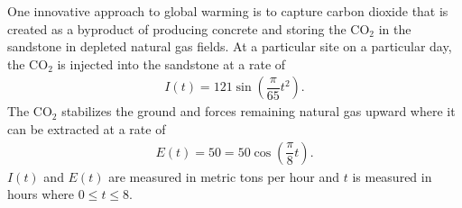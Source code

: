 \begin{questions}
    One innovative approach to global warming is to capture carbon dioxide that is created as a byproduct of producing concrete and storing the $\mathrm{CO_2}$ in the sandstone in depleted natural gas fields. At a particular site on a particular day, the $\mathrm{CO_2}$ is injected into the sandstone at a rate of \begin{align*}
        I(t) = 121\sin \left(\dfrac{\pi}{65}t^2\right).
    \end{align*}
    The $\mathrm{CO_2}$ stabilizes the ground and forces remaining natural gas upward where it can be extracted at a rate of \begin{align*}
        E(t) = 50 = 50\cos \left(\dfrac{\pi}{8}t\right).
    \end{align*}
    $I(t)$ and $E(t)$ are measured in metric tons per hour and $t$ is measured in hours where $0 \leq t \leq 8$. \\

\end{questions}
